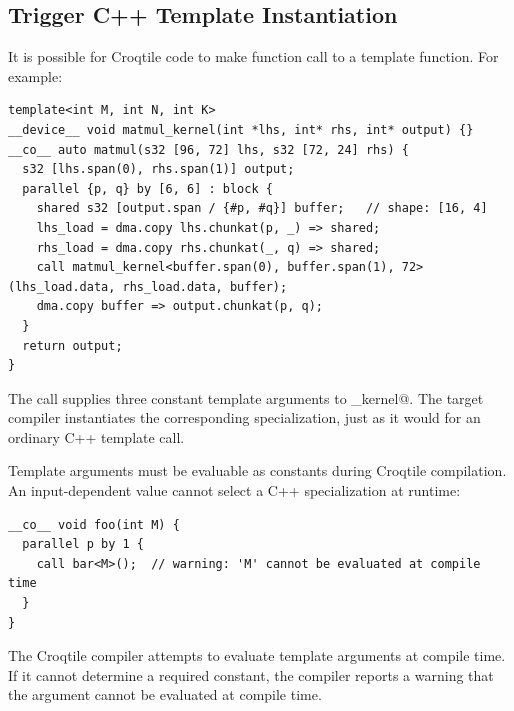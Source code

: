 \subsection*{Trigger C++ Template Instantiation}

It is possible for Croqtile code to make function call to a template function. For example:

\begin{lstlisting}[language=croqtile,caption={A templated device helper}]
template<int M, int N, int K>
__device__ void matmul_kernel(int *lhs, int* rhs, int* output) {}
__co__ auto matmul(s32 [96, 72] lhs, s32 [72, 24] rhs) {
  s32 [lhs.span(0), rhs.span(1)] output;
  parallel {p, q} by [6, 6] : block {
    shared s32 [output.span / {#p, #q}] buffer;   // shape: [16, 4]
    lhs_load = dma.copy lhs.chunkat(p, _) => shared;
    rhs_load = dma.copy rhs.chunkat(_, q) => shared;
    call matmul_kernel<buffer.span(0), buffer.span(1), 72>(lhs_load.data, rhs_load.data, buffer);
    dma.copy buffer => output.chunkat(p, q);
  }
  return output;
}
\end{lstlisting}

The call supplies three constant template arguments to \co@matmul_kernel@. The target compiler instantiates the corresponding specialization, just as it would for an ordinary C++ template call.

Template arguments must be evaluable as constants during Croqtile compilation. An input-dependent value cannot select a C++ specialization at runtime:

\begin{lstlisting}[language=croqtile,caption={A call that instantiates it}]
__co__ void foo(int M) {
  parallel p by 1 {
    call bar<M>();  // warning: 'M' cannot be evaluated at compile time
  }
}
\end{lstlisting}

The Croqtile compiler attempts to evaluate template arguments at compile time. If it cannot determine a required constant, the compiler reports a warning that the argument cannot be evaluated at compile time.

